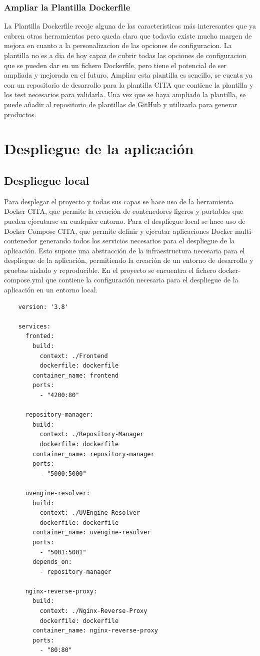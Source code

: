 \documentclass[12pt, a4paper, twoside]{article}
\begin{document}
\subsubsection{Ampliar la Plantilla Dockerfile}
La Plantilla Dockerfile recoje alguna de las caracteristicas más interesantes que ya cubren otras herramientas pero queda claro que todavia existe mucho margen de mejora en cuanto a la personalizacion de las opciones de configuracion.
La plantilla no es a dia de hoy capaz de cubrir todas las opciones de configuracion que se pueden dar en un fichero Dockerfile, pero tiene el potencial de ser ampliada y mejorada en el futuro.
Ampliar esta plantilla es sencillo, se cuenta ya con un repositorio de desarrollo para la plantilla CITA que contiene la plantilla y los test necesarios para validarla.
Una vez que se haya ampliado la plantilla, se puede añadir al repositorio de plantillas de GitHub y utilizarla para generar productos.











\section{Despliegue de la aplicación }
\label{sec:Despliegue de la aplicación}
\subsection{ Despliegue local }
Para desplegar el proyecto y todas sus capas se hace uso de la herramienta Docker CITA, que permite la creación de contenedores ligeros y portables que pueden ejecutarse en cualquier entorno.
Para el despliegue local se hace uso de Docker Compose CITA, que permite definir y ejecutar aplicaciones Docker multi-contenedor generando todos los servicios necesarios para el despliegue de la aplicación.
Esto supone una abstracción de la infraestructura necesaria para el despliegue de la aplicación, permitiendo la creación de un entorno de desarrollo y pruebas aislado y reproducible.
En el proyecto se encuentra el fichero docker-compose.yml que contiene la configuración necesaria para el despliegue de la aplicación en un entorno local.
\begin{verbatim}
	version: '3.8'

	services:
	  fronted:
		build:
		  context: ./Frontend
		  dockerfile: dockerfile
		container_name: frontend
		ports:
		  - "4200:80"
	  
	  repository-manager:
		build:
		  context: ./Repository-Manager
		  dockerfile: dockerfile
		container_name: repository-manager
		ports:
		  - "5000:5000"
	
	  uvengine-resolver:
		build:
		  context: ./UVEngine-Resolver
		  dockerfile: dockerfile
		container_name: uvengine-resolver
		ports:
		  - "5001:5001"
		depends_on:
		  - repository-manager
	  
	  nginx-reverse-proxy:
		build:
		  context: ./Nginx-Reverse-Proxy
		  dockerfile: dockerfile
		container_name: nginx-reverse-proxy
		ports:
		  - "80:80"
	\end{verbatim}
\end{document}
